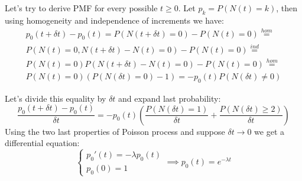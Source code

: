 \documentclass[a4paper, 12pt]{article}
\newcommand{\rbra}[1]{\left( #1 \right)}
\begin{document}
\begin{enumerate}
\begin{enumerate}
{                  Let's try to derive PMF for every possible $t \geq 0$. Let $p_k = P(N(t) = k)$, then
                  using homogeneity and independence of increments we have:
                  \begin{multline*}
                      p_0(t + \delta t) - p_0(t) = P(N(t+ \delta t) = 0) - P(N(t) = 0) \stackrel{hom}{=} \\
                      P(N(t) = 0, N(t + \delta t) - N(t) = 0) - P(N(t) = 0) \stackrel{ind}{=} \\
                      P(N(t) = 0) P(N(t + \delta t) - N(t) = 0) - P(N(t) = 0) \stackrel{hom}{=} \\
                      P(N(t) = 0) \rbra{P(N(\delta t) = 0) - 1} = -p_0(t) P(N(\delta t) \neq 0)
                  \end{multline*}

                  Let's divide this equality by $\delta t$ and expand last probability:
                  \[
                      \frac{p_0(t + \delta t) - p_0(t)}{\delta t} = -p_0(t)
                      \rbra{\frac{P(N(\delta t) = 1)}{\delta t} +
                          \frac{P(N(\delta t) \geq 2)}{\delta t} }
                  \]
                  Using the two last properties of Poisson process and suppose $\delta t \rightarrow 0$ we
                  get a differential equation:
                  \[
                      \begin{cases}
                          p_0'(t) = - \lambda p_0(t) \\
                          p_0(0) = 1
                      \end{cases} \implies
                      p_0(t) = e^{-\lambda t}
                  \]

}
\end{enumerate}
\end{enumerate}
\end{document}
